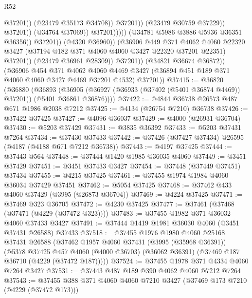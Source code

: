 \begin{lexlean}{R52}
\begin{coremodule}
                                                    @37201))
                                                (@23479 @35173 @34708))
                                              @37201))
                                          (@23479 @30759 @37229))
                                        @37201))
                                    (@34764 @37069))
                                  @37201)))))
                        (@34781 @5986 @3886 @5936 @36351 @36356))
                      @37201))
                  (@4320 @36960))
                (@36906
                  @449
                  @371
                  @4062
                  @4060
                  @22320
                  @3427
                  (@37194 @182 @371 @4060 @4060 @3427 @22320 @37201 @22351)
                  @37201))
              (@23479 @36961 @28309))
            @37201))
        (@34821 @36674 @36872))
      (@36906
        @454
        @371
        @4062
        @4060
        @4469
        @3427
        (@36894 @451 @189 @371 @4060 @4060 @3427 @4469 @37201 @4532)
        @37201))
@37415 := @36820
    (@36880
      (@36893
        (@36905 (@36927 (@36933 (@37402 (@5401 @36874 @4469)) @37201)) (@5401 @36861 @36876))))
@37422 := @4844 @36738 @26573 @487 @671 @1986 @2038 @7212
@37425 := @4134 (@26754 @7210) @36738
@37426 := @37422 @37425
@37427 := @4096 @36037
@37429 := @4000 (@26931 @36704)
@37430 := @5203 @37429
@37431 := @3835 @36392
@37433 := @5203 @37431 @7264
@37434 := @37430 @37433
@37442 := @37426 (@37427 @37434) @26595 (@4187 (@4188 @671 @7212 @36738))
@37443 := @4197 @37425
@37444 := @37443 @564
@37448 := @37444 @1420 @1985 @36035 @4060
@37449 := @3451 @37429
@37451 := @3451 @37433 @3427
@37454 := @37448 (@37449 @37451) @37434
@37455 := @4215 @37425
@37461 := @37455 @1974 @1984 @4060 @36034 @37429 @37451
@37462 := @5054 @37425
@37468 := @37462 @433 @4060 @37429 (@3995 (@26873 @36704))
@37469 := @4224 @37425
@37471 := @37469 @323 @36705
@37472 := @4230 @37425
@37477 := @37461 (@37468 (@37471 (@4229 (@37472 @323))))
@37483 := @37455 @1982 @371 @36032 @4060 @37433 @3427
@37491 := @37444 @1419 @1981 @36030 @4060 (@3451 @37431 @26588) @37433
@37518 := @37455
    @1976
    @1980
    @4060
    @25168
    @37431
    @26588
    (@37462
      @1957
      @4060
      @37431
      (@3995 (@35968 @36391))
      (@5378
        @37425
        @457
        @4060
        (@4000 @36703)
        (@36062 @36391)
        (@37469 @187 @36710 (@4229 (@37472 @187)))))
@37524 := @37455 @1978 @371 @4334 @4060 @7264 @3427
@37531 := @37443 @487 @189 @390 @4062 @4060 @7212 @7264
@37543 := @37455 @388 @371 @4060 @4060 @7210 @3427 (@37469 @173 @7210 (@4229 (@37472 @173)))

\end{coremodule}
\end{lexlean}
